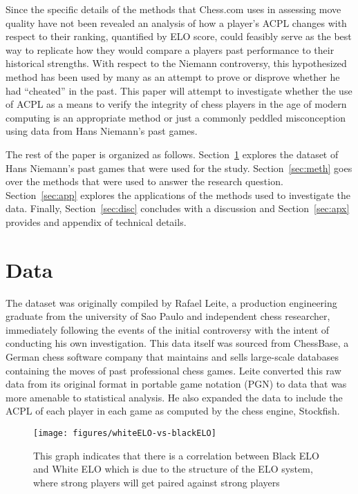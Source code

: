 \documentclass[12pt, letterpaper, titlepage]{article}
\begin{document}
Since the specific details of the methods that Chess.com uses in assessing move quality have not been revealed an analysis of how a player's ACPL changes with respect to their ranking, quantified by ELO score, could feasibly serve as the best way to replicate how they would compare a players past performance to their historical strengths. With respect to the Niemann controversy, this hypothesized method has been used by many as an attempt to prove or disprove whether he had “cheated” in the past. This paper will attempt to investigate whether the use of ACPL as a means to verify the integrity of chess players in the age of modern computing is an appropriate method or just a commonly peddled misconception using data from Hans Niemann's past games.

The rest of the paper is organized as follows. Section~\ref{sec:data} explores the dataset of Hans Niemann's past games that were used for the study. Section~\ref{sec:meth} goes over the methods that were used to answer the research question. Section~\ref{sec:app} explores the applications of the methods used to investigate the data. Finally, Section~\ref{sec:disc} concludes with a discussion and Section~\ref{sec:apx} provides and appendix of technical details.

\section{Data}
\label{sec:data}

The dataset was originally compiled by Rafael Leite, a production engineering graduate from the university of Sao Paulo and independent chess researcher, immediately following the events of the initial controversy with the intent of conducting his own investigation. This data itself was sourced from ChessBase, a German chess software company that maintains and sells large-scale databases containing the moves of past professional chess games. Leite converted this raw data from its original format in portable game notation (PGN) to data that was more amenable to statistical analysis. He also expanded the data to include the ACPL of each player in each game as computed by the chess engine, Stockfish.

\begin{figure}[!htb]
    \centering
    \texttt{[image: figures/whiteELO-vs-blackELO]}
    \caption{This graph indicates that there is a correlation between Black ELO and White ELO which is due to the structure of the ELO system, where strong players will get paired against strong players}
    \label{fig:elo_lineplot}
\end{figure}
\end{document}
